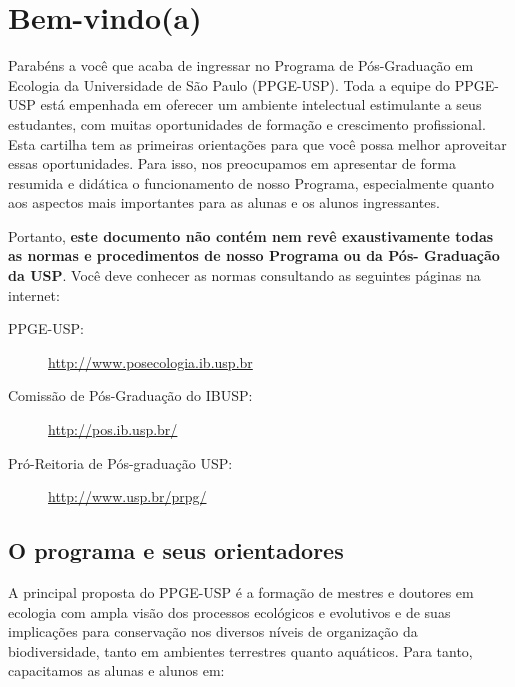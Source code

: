 \documentclass[twoside a4paper 12pt]{report}
\begin{document}
\Large




\pagestyle{fancy}


\chapter{Bem-vindo(a)}
\label{chap:aprest}

Parabéns a você que acaba de ingressar no Programa de Pós-Graduação em
Ecologia da Universidade de São Paulo (PPGE-USP). Toda a equipe do
PPGE-USP está empenhada em oferecer um ambiente intelectual
estimulante a seus estudantes, com muitas oportunidades de formação e
crescimento profissional. Esta cartilha tem as primeiras orientações
para que você possa melhor aproveitar essas oportunidades. Para isso,
nos preocupamos em apresentar de forma resumida e didática o
funcionamento de nosso Programa, especialmente quanto aos aspectos
mais importantes para as alunas e os alunos ingressantes.

Portanto, \textbf{este documento não contém nem revê exaustivamente
todas as normas e procedimentos de nosso Programa ou da Pós- Graduação
da USP}. Você deve conhecer as normas consultando as seguintes páginas
na internet:

\begin{description}
\item[PPGE-USP:] \url{http://www.posecologia.ib.usp.br}
\item[Comissão de Pós-Graduação do IBUSP:] \url{http://pos.ib.usp.br/}
\item[Pró-Reitoria de Pós-graduação USP:] \url{http://www.usp.br/prpg/}
\end{description}


\section{O programa e seus orientadores}

A principal proposta do PPGE-USP é a formação de mestres e doutores em ecologia com ampla
visão dos processos ecológicos e evolutivos e de suas implicações para
conservação nos diversos níveis de organização da biodiversidade, tanto
em ambientes terrestres quanto aquáticos. Para tanto, capacitamos as
alunas e alunos em:
\end{document}
